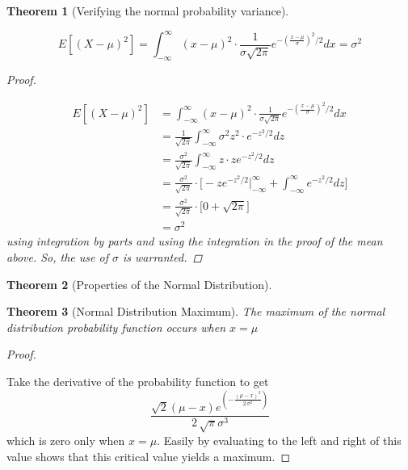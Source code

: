 \documentclass[10pt,]{book}
\theoremstyle{plain}
\newtheorem{theorem}{Theorem}[section]
\theoremstyle{definition}
\theoremstyle{definition}
\theoremstyle{definition}
\numberwithin{equation}{section}
\begin{document}
	
	\begin{theorem}[{Verifying the normal probability variance}]\label{theorem-57}

		\begin{equation*}E[(X-\mu)^2] = \int_{-\infty}^{\infty} (x-\mu)^2 \cdot \frac{1}{\sigma \sqrt{2 \pi}} e^{ - \left ( \frac{x-\mu}{\sigma} \right ) ^2 / 2} dx = \sigma^2\end{equation*}
\begin{proof}\hypertarget{proof-56}{}

	\begin{align*}
E[(X-\mu)^2] & = \int_{-\infty}^{\infty} (x-\mu)^2 \cdot \frac{1}{\sigma \sqrt{2 \pi}} e^{ - \left ( \frac{x-\mu}{\sigma} \right ) ^2 / 2} dx\\
 & = \frac{1}{\sqrt{2 \pi}} \int_{-\infty}^{\infty} \sigma^2 z^2 \cdot  e^{ -z^2 / 2} dz\\
 & = \frac{\sigma^2}{\sqrt{2 \pi}} \int_{-\infty}^{\infty} z \cdot z e^{ -z^2 / 2} dz\\
 & = \frac{\sigma^2}{\sqrt{2 \pi}} \cdot \big [ -z e^{-z^2 / 2} \big |_{-\infty}^{\infty} + \int_{-\infty}^{\infty}  e^{ -z^2 / 2}  dz \big ]\\
 & = \frac{\sigma^2}{\sqrt{2 \pi}} \cdot \big [ 0 + \sqrt{2 \pi} \big ]\\
 & = \sigma^2 
\end{align*}
	using integration by parts and using the integration in the proof of the mean above.  So, the use of \(\sigma\) is warranted.
\end{proof}
\end{theorem}

	
	\begin{theorem}[{Properties of the Normal Distribution}]\label{theorem-58}
\end{theorem}

	
	\begin{theorem}[{Normal Distribution Maximum}]\label{theorem-59}
The maximum of the normal distribution probability function occurs when \(x = \mu\)
\end{theorem}
\begin{proof}\hypertarget{proof-57}{}
Take the derivative of the probability function to get 
	\begin{equation*}\frac{\sqrt{2} {\left(\mu - x\right)} e^{\left(-\frac{{\left(\mu - x\right)}^{2}}{2 \, \sigma^{2}}\right)}}{2 \, \sqrt{\pi} \sigma^{3}}\end{equation*}
	which is zero only when \(x = \mu\).  Easily by evaluating to the left and right of this value shows that this critical value yields a maximum.
\end{proof}
\end{document}
